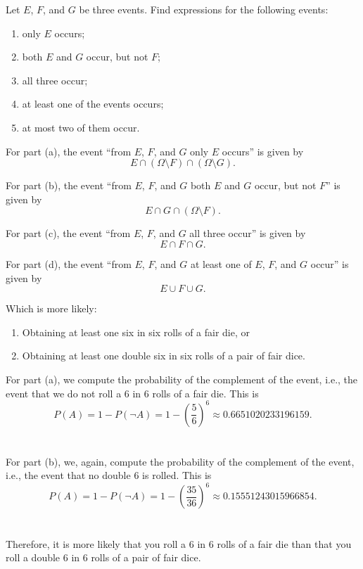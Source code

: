 \begin{problem}[Handout 1, \# 11]
  Let \(E\), \(F\), and \(G\) be three events. Find expressions for the
  following events:
  \begin{enumerate}[label=(\alph*),noitemsep]
  \item only \(E\) occurs;
  \item both \(E\) and \(G\) occur, but not \(F\);
  \item all three occur;
  \item at least one of the events occurs;
  \item at most two of them occur.
  \end{enumerate}
\end{problem}
\begin{solution*}
  For part (a), the event ``from \(E\), \(F\), and \(G\) only \(E\)
  occurs'' is given by
  \[
    E\cap(\Omega\setminus F)\cap(\Omega\setminus G).
  \]

  For part (b), the event ``from \(E\), \(F\), and \(G\) both \(E\) and
  \(G\) occur, but not \(F\)'' is given by
  \[
    E\cap G\cap(\Omega\setminus F).
  \]

  For part (c), the event ``from \(E\), \(F\), and \(G\) all three occur''
  is given by
  \[
    E\cap F\cap G.
  \]

  For part (d), the event ``from \(E\), \(F\), and \(G\) at least one of
  \(E\), \(F\), and \(G\) occur'' is given by
  \[
    E\cup F\cup G.
  \]
\end{solution*}

\begin{problem}[Handout 1, \# 12]
  Which is more likely:
  \begin{enumerate}[label=(\alph*),noitemsep]
  \item Obtaining at least one six in six rolls of a fair die, or
  \item Obtaining at least one double six in six rolls of a pair of fair
    dice.
  \end{enumerate}
\end{problem}
\begin{solution*}
  For part (a), we compute the probability of the complement of the event,
  i.e., the event that we do not roll a \(6\) in \(6\) rolls of a fair
  die. This is
  \[
    P(A)=1-P(\lnot
    A)=1-\left(\frac{5}{6}\right)^6\approx\num{0.6651020233196159}.
  \]
  \\\\
  For part (b), we, again, compute the probability of the complement of the
  event, i.e., the event that no double \(6\) is rolled. This is
  \[
    P(A)=1-P(\lnot
    A)=1-\left(\frac{35}{36}\right)^6\approx\num{0.15551243015966854}.
  \]
  \\\\
  Therefore, it is more likely that you roll a \(6\) in \(6\) rolls of a
  fair die than that you roll a double \(6\) in \(6\) rolls of a pair of
  fair dice.
\end{solution*}


